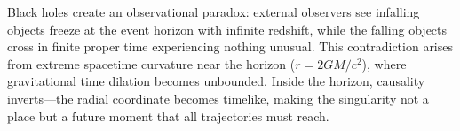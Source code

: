 Black holes create an observational paradox: external observers see infalling objects freeze at the event horizon with infinite redshift, while the falling objects cross in finite proper time experiencing nothing unusual. This contradiction arises from extreme spacetime curvature near the horizon ($r = 2GM/c^2$), where gravitational time dilation becomes unbounded. Inside the horizon, causality inverts—the radial coordinate becomes timelike, making the singularity not a place but a future moment that all trajectories must reach. 
